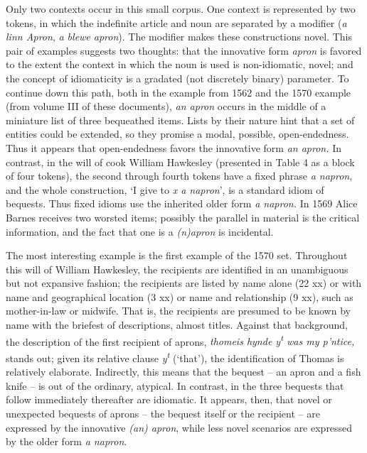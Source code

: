\documentclass[output=paper,
modfonts
]{LSP/langsci}
\begin{document}
Only two contexts occur in this small corpus. One context is represented
by two tokens, in which the indefinite article and noun are separated by
a modifier (\emph{a linn Apron}, \emph{a blewe apron}). The modifier
makes these constructions novel. This pair of examples suggests two
thoughts: that the innovative form \emph{apron} is favored to the extent
the context in which the noun is used is non-idiomatic, novel; and the
concept of idiomaticity is a gradated (not discretely binary) parameter.
To continue down this path, both in the example from 1562 and the 1570
example (from volume III of these documents), \emph{an apron} occurs in
the middle of a miniature list of three bequeathed items. Lists by their
nature hint that a set of entities could be extended, so they promise a
modal, possible, open-endedness. Thus it appears that open-endedness
favors the innovative form \emph{an apron.} In contrast, in the will of
cook William Hawkesley (presented in Table 4 as a block of four tokens),
the second through fourth tokens have a fixed phrase \emph{a napron},
and the whole construction, `I give to \emph{x a napron}', is a standard
idiom of bequests. Thus fixed idioms use the inherited older form
\emph{a napron.} In 1569 Alice Barnes receives two worsted items;
possibly the parallel in material is the critical information, and the
fact that one is a \emph{(n)apron} is incidental.

The most interesting example is the first example of the 1570 set.
Throughout this will of William Hawkesley, the recipients are identified
in an unambiguous but not expansive fashion; the recipients are listed
by name alone (22 xx) or with name and geographical location (3 xx) or
name and relationship (9 xx), such as mother-in-law or midwife. That is,
the recipients are presumed to be known by name with the briefest of
descriptions, almost titles. Against that background, the description of
the first recipient of aprons, \emph{thomeis hynde y\textsuperscript{t}
was my p'ntice,} stands out; given its relative clause
\emph{y\textsuperscript{t}} (`that'), the identification of Thomas is
relatively elaborate. Indirectly, this means that the bequest -- an apron
and a fish knife -- is out of the ordinary, atypical. In contrast, in the
three bequests that follow immediately thereafter are idiomatic. It
appears, then, that novel or unexpected bequests of aprons -- the bequest
itself or the recipient -- are expressed by the innovative \emph{(an)
apron}, while less novel scenarios are expressed by the older form
\emph{a napron}.
\end{document}
